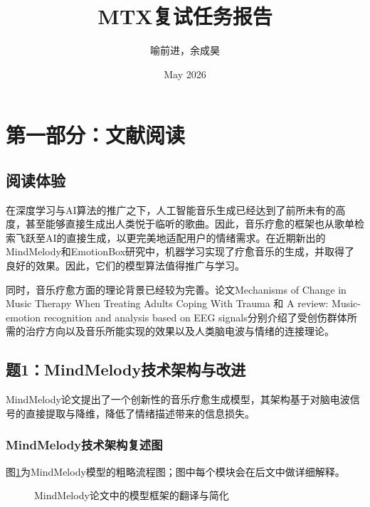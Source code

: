 \documentclass[12pt, fontset=windows]{ctexart}
\title{\textbf{MTX复试任务报告}}
\author{喻前进，余成昊}
\date{May 2026}
\begin{document}
\maketitle


\pagestyle{mainstyle}
\tableofcontents
\clearpage

\section{第一部分：文献阅读}
\subsection{阅读体验}

在深度学习与AI算法的推广之下，人工智能音乐生成已经达到了前所未有的高度，甚至能够直接生成出人类悦于临听的歌曲。因此，音乐疗愈的框架也从歌单检索飞跃至AI的直接生成，以更完美地适配用户的情绪需求。在近期新出的MindMelody和EmotionBox研究中，机器学习实现了疗愈音乐的生成，并取得了良好的效果。因此，它们的模型算法值得推广与学习。

同时，音乐疗愈方面的理论背景已经较为完善。论文Mechanisms of Change in Music Therapy When Treating Adults Coping With Trauma 和 A review: Music-emotion recognition and analysis based on EEG signals分别介绍了受创伤群体所需的治疗方向以及音乐所能实现的效果以及人类脑电波与情绪的连接理论。

\subsection{题1：MindMelody技术架构与改进}

MindMelody论文提出了一个创新性的音乐疗愈生成模型，其架构基于对脑电波信号的直接提取与降维，降低了情绪描述带来的信息损失。
\subsubsection{MindMelody技术架构复述图}
图\ref{fig:mmflow}为MindMelody模型的粗略流程图；图中每个模块会在后文中做详细解释。
\begin{figure}[H]
    \centering
    \caption{MindMelody论文中的模型框架的翻译与简化}
    \label{fig:mmflow}
\end{figure}
\end{document}

